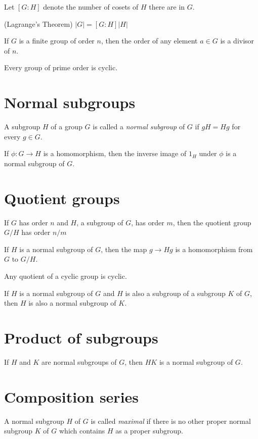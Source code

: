 Let $[G:H]$ denote the number of cosets of $H$ there are in $G$.

\theorem (Lagrange's Theorem)
$|G| = [G:H]|H|$

\theorem 
If $G$ is a finite group of order $n$, then the order of any element $a \in G$ is a divisor of $n$.

\theorem
Every group of prime order is cyclic.


\section{Normal subgroups}

A subgroup $H$ of a group $G$ is called a \textit{normal subgroup} of $G$ if $gH = Hg$ for every $g \in G$.

\theorem

\example

\theorem 
If $\phi: G \to H$ is a homomorphism, then the inverse image of $1_H$ under $\phi$ is a normal subgroup of $G$. 


\section{Quotient groups}

\theorem
If $G$ has order $n$ and $H$, a subgroup of $G$, has order $m$, then the quotient group $G/H$ has order $n/m$

\theorem
If $H$ is a normal subgroup of $G$, then the map $g \to Hg$ is a homomorphism from $G$ to $G/H$.

\theorem
Any quotient of a cyclic group is cyclic.

\theorem
If $H$ is a normal subgroup of $G$ and $H$ is also a subgroup of a subgroup $K$ of $G$, then $H$ is also a normal subgroup of $K$.


\section{Product of subgroups}

\theorem If $H$ and $K$ are normal subgroups of $G$, then $HK$ is a normal subgroup of $G$.


\section{Composition series}

A normal subgroup $H$ of $G$ is called \textit{maximal} if there is no other proper normal subgroup $K$ of $G$ which contains $H$ as a proper subgroup.

